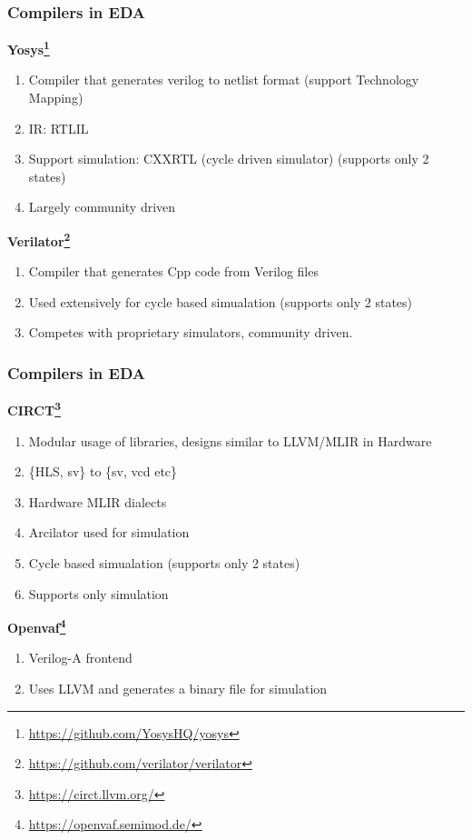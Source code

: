 \documentclass{beamer}
\begin{document}
\newcommand\myheading[1]{%
  \par\bigskip
  {\Large\bfseries#1}\par\smallskip}

\begin{frame}[fragile]
    \frametitle{Compilers in EDA}
     \myheading{Yosys\footnote{\url{https://github.com/YosysHQ/yosys}}}
        \begin{enumerate}
            \item Compiler that generates  verilog to netlist format (support Technology Mapping)
            \item IR: RTLIL
            \item Support simulation: CXXRTL (cycle driven simulator) (supports
              only 2 states)
            \item Largely community driven
        \end{enumerate}
    \myheading{Verilator\footnote{\url{https://github.com/verilator/verilator}}}
        \begin{enumerate}
            \item Compiler that generates Cpp code from Verilog files
            \item Used extensively for cycle based simualation (supports only 2 states)
            \item Competes with proprietary simulators, community driven.
        \end{enumerate}
    
\end{frame}

\begin{frame}[fragile]
    \frametitle{Compilers in EDA}
    \myheading{CIRCT\footnote{\url{https://circt.llvm.org/}}}
        \begin{enumerate}
            \item Modular usage of libraries, designs similar to LLVM/MLIR in Hardware  
            \item \{HLS, sv\} to \{sv, vcd etc\}
            \item Hardware MLIR  dialects 
            \item Arcilator used for simulation 
                \item Cycle based simualation (supports only 2 states)
            \item Supports only simulation 
        \end{enumerate}
    \myheading{Openvaf\footnote{\url{https://openvaf.semimod.de/}}}
        \begin{enumerate}
            \item Verilog-A frontend 
            \item Uses LLVM and generates a binary file for simulation
        \end{enumerate}
\end{frame}
\end{document}
